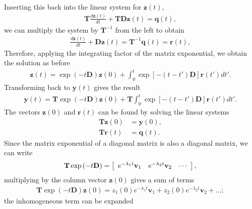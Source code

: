 Inserting this back into the linear system for $\mathbf{z}(t)$,
\begin{align}
  \mathbf{T} \frac{d \mathbf{z}(t)}{dt} + \mathbf{T} \mathbf{D} \mathbf{z}(t) = \mathbf{q}(t), 
\end{align}
we can multiply the system by $\mathbf{T}^{-1}$ from the left to obtain
\begin{align}
  \frac{d \mathbf{z}(t)}{dt} + \mathbf{D} \mathbf{z}(t) = \mathbf{T}^{-1} \mathbf{q}(t) = \mathbf{r}(t), 
\end{align}
Therefore, applying the integrating factor of the matrix exponential, we obtain the solution as before
\begin{align}
   \mathbf{z}(t)  = \exp \left( -t \mathbf{D} \right) \mathbf{z}(0) + \int_0^t  \exp \left[ -( t - t' ) \mathbf{D} \right] \mathbf{r}(t') dt'.
\end{align}
Transforming back to $\mathbf{y}(t)$ gives the result
\begin{align}
   \mathbf{y}(t)  =  \mathbf{T} \exp \left( -t \mathbf{D} \right) \mathbf{z}(0) + \mathbf{T} \int_0^t  \exp \left[ -( t - t' ) \mathbf{D} \right] \mathbf{r}(t') dt'.
\end{align}
The vectors $\mathbf{z}(0)$ and $\mathbf{r}(t)$ can be found by solving the linear systems
\begin{subequations}
\begin{align}
  \mathbf{T} \mathbf{z}(0) &= \mathbf{y}(0), \\
  \mathbf{T} \mathbf{r}(t) &= \mathbf{q}(t).
\end{align}
\end{subequations}
Since the matrix exponential of a diagonal matrix is also a diagonal matrix, we can write
\begin{align}
  \mathbf{T} \exp \left( -t \mathbf{D} \right) = 
  \left[ \begin{array}{c c c} e^{-\lambda_1 t} \mathbf{v}_1 & e^{-\lambda_2 t}  \mathbf{v}_2 & \cdots \end{array} \right] ,
\end{align}
multiplying by the column vector $\mathbf{z}(0)$ gives a sum of terms
\begin{align}
  \mathbf{T} \exp \left( -t \mathbf{D} \right)  \mathbf{z}(0) = 
   z_1(0) e^{-\lambda_1 t} \mathbf{v}_1 +  z_2(0) e^{-\lambda_2 t} \mathbf{v}_2 + \ldots ;
\end{align}
the inhomogeneous term can be expanded
